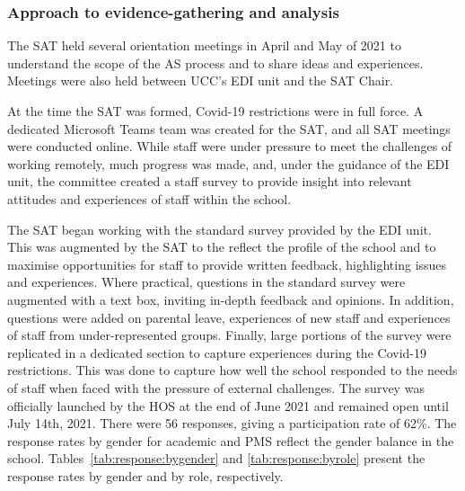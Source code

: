 \subsubsection{Approach to evidence-gathering and analysis}

The SAT held several orientation meetings in April and May of 2021 to understand the scope of the AS process and to share ideas and experiences. Meetings were also held between UCC's EDI unit and the SAT Chair. 

At the time the SAT was formed, Covid-19 restrictions were in full force. A dedicated Microsoft Teams team was created for the SAT, and all SAT meetings were conducted online.
While staff were under pressure to meet the challenges of working remotely, much progress was made, and, under the guidance of the EDI unit, the committee created a staff survey to provide insight into relevant attitudes and experiences of staff within the school.

The SAT began working with the standard survey provided by the EDI unit. This was augmented by the SAT to the reflect the profile of the school and to maximise opportunities for staff to provide written feedback, highlighting issues and experiences. 
Where practical, questions in the standard survey were augmented with a text box, inviting in-depth feedback and opinions. 
In addition, questions were added on parental leave, experiences of new staff and experiences of staff from under-represented groups. Finally, large portions of the survey were replicated in a dedicated section to capture experiences during the Covid-19 restrictions. This was done to capture how well the school responded to the needs of staff when faced with the pressure of external challenges. The survey was officially launched by the \ac{HOS} at the end of June 2021 and remained open until July 14th, 2021. %
There were 56 responses, giving a participation rate of 62\%.  The response rates by gender for academic and PMS reflect the gender balance in the school. Tables~\ref{tab:response:bygender} and \ref{tab:response:byrole} present the response rates by gender and by role, respectively.

